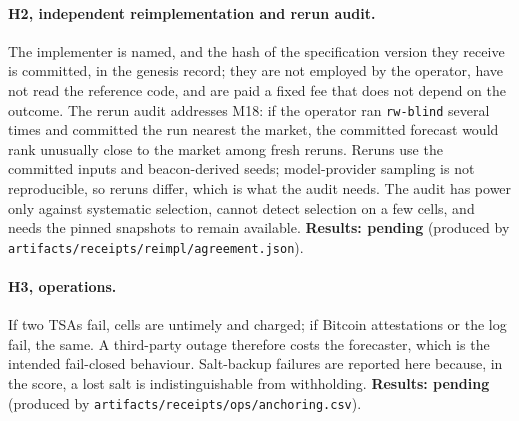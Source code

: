 \documentclass[11pt]{article}
\newcommand{\pending}[1]{\textbf{Results: pending} (produced by \nolinkurl{#1}).}
\begin{document}
\paragraph{H2, independent reimplementation and rerun audit.} The implementer is named, and the hash of the specification version they receive is committed, in the genesis record; they are not employed by the operator, have not read the reference code, and are paid a fixed fee that does not depend on the outcome. The rerun audit addresses M18: if the operator ran \texttt{rw-blind} several times and committed the run nearest the market, the committed forecast would rank unusually close to the market among fresh reruns. Reruns use the committed inputs and beacon-derived seeds; model-provider sampling is not reproducible, so reruns differ, which is what the audit needs. The audit has power only against systematic selection, cannot detect selection on a few cells, and needs the pinned snapshots to remain available. \pending{artifacts/receipts/reimpl/agreement.json}

\paragraph{H3, operations.} If two TSAs fail, cells are untimely and charged; if Bitcoin attestations or the log fail, the same. A third-party outage therefore costs the forecaster, which is the intended fail-closed behaviour. Salt-backup failures are reported here because, in the score, a lost salt is indistinguishable from withholding. \pending{artifacts/receipts/ops/anchoring.csv}
\end{document}
